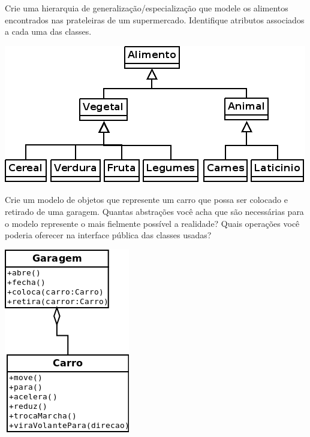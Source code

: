 \documentclass[12pt]{exam}
\begin{document}
\begin{questions}
      \question 
        Crie uma hierarquia de generalização/especialização que modele os alimentos encontrados nas prateleiras de um supermercado. Identifique 
        atributos associados a cada uma das classes.
        \begin{solution}
          \begin{center}
            \includegraphics[width=.8\textwidth]{./exercicios-capitulo1-e9.png}
          \end{center}
        \end{solution}

      
      \question 
      Crie um modelo de objetos que represente um carro que possa ser colocado e retirado de uma garagem. Quantas abstrações você acha que são
      necessárias para o modelo represente o mais fielmente possível a realidade? Quais operações você poderia oferecer na interface pública das
      classes usadas?
        \begin{solution}
          \begin{center}
            \includegraphics[width=.3\textwidth]{./exercicios-capitulo1-e10.png}
          \end{center}
        \end{solution}
      

\end{questions}
\end{document}
